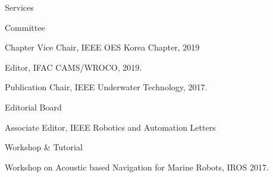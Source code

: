 \begin{rSection}{Services}


\begin{rSubsection}{Committee}{}{}{}
  \item Chapter Vice Chair, IEEE OES Korea Chapter, 2019
  \item Editor, IFAC CAMS/WROCO, 2019.
  \item Publication Chair, IEEE Underwater Technology, 2017.





\end{rSubsection}

\begin{rSubsection}{Editorial Board}{}{}{}
  \item Associate Editor, IEEE Robotics and Automation Letters
\end{rSubsection}

\begin{rSubsection}{Workshop \& Tutorial}{}{}{}
  \item Workshop on Acoustic based Navigation for Marine Robots, IROS 2017.
\end{rSubsection}


\end{rSection}
